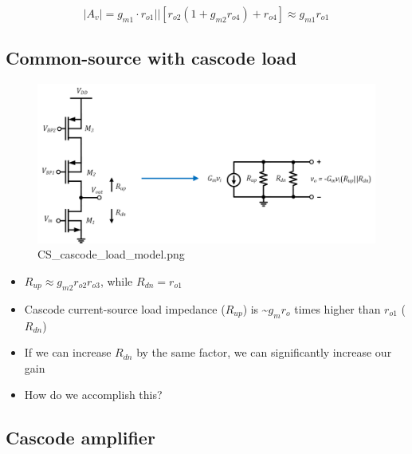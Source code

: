 \documentclass[11pt]{article}
\providecommand{\tightlist}{%
      \setlength{\itemsep}{0pt}\setlength{\parskip}{0pt}}
\begin{document}
\begin{equation}
|A_v| = g_{m1}\cdot r_{o1}||\left[r_{o2}(1+g_{m2} r_{o4}) + r_{o4}\right] \approx g_{m1}r_{o1}
\end{equation}

    \hypertarget{common-source-with-cascode-load}{%
\subsection{Common-source with cascode
load}\label{common-source-with-cascode-load}}

    \begin{figure}
\centering
\includegraphics{CS_cascode_load_model.png}
\caption{CS\_cascode\_load\_model.png}
\end{figure}

    \begin{itemize}
\tightlist
\item
  \(R_{up} \approx g_{m2}r_{o2}r_{o3}\), while \(R_{dn} = r_{o1}\)
\item
  Cascode current-source load impedance (\(R_{up}\)) is
  \textasciitilde{}\(g_m r_o\) times higher than \(r_{o1}\) (\(R_{dn}\))
\item
  If we can increase \(R_{dn}\) by the same factor, we can significantly
  increase our gain
\item
  How do we accomplish this?
\end{itemize}

    \hypertarget{cascode-amplifier}{%
\subsection{Cascode amplifier}\label{cascode-amplifier}}
\end{document}

